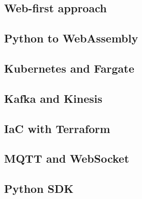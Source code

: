\subsection{Web-first approach}
\label{chapter4-web-first-approach}

\subsection{Python to WebAssembly}
\label{chapter4-python-to-webassembly}

\subsection{Kubernetes and Fargate}
\label{chapter4-kubernetes-and-aws-fargate}

\subsection{Kafka and Kinesis}
\label{chapter4-kafka-aws-kinesis}

\subsection{IaC with Terraform}
\label{chapter4-iac-with-terraform}

\subsection{MQTT and WebSocket}
\label{chapter4-mqtt-and-websocket}

\subsection{Python SDK}
\label{chapter4-python-sdk}

